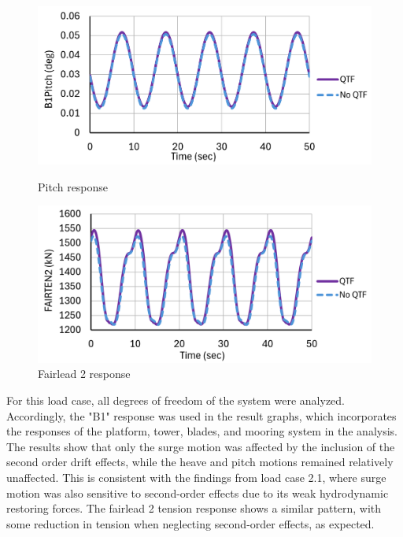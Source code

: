 \documentclass[a4paper, 11pt]{article}
\begin{document}
\begin{figure}[H]
    \begin{minipage}{0.48\textwidth}
        \centering
        \includegraphics[width=1\textwidth]{3.1_pitch.png}
        \caption{\small Pitch response}
        \label{fig:3.1_pitch}
    \end{minipage}
    \hfill
    \begin{minipage}{0.48\textwidth}
        \centering
        \includegraphics[width=1\textwidth]{3.1_fairten.png}
        \caption{\small Fairlead 2 response}
        \label{fig:3.1_fairten}
    \end{minipage}
\end{figure}

For this load case, all degrees of freedom of the system were analyzed. Accordingly, the "B1" response was used in the result graphs, which incorporates the responses of the platform, tower, blades, and mooring system in the analysis. The results show that only the surge motion was affected by the inclusion of the second order drift effects, while the heave and pitch motions remained relatively unaffected. This is consistent with the findings from load case 2.1, where surge motion was also sensitive to second-order effects due to its weak hydrodynamic restoring forces. The fairlead 2 tension response shows a similar pattern, with some reduction in tension when neglecting second-order effects, as expected.
\end{document}
